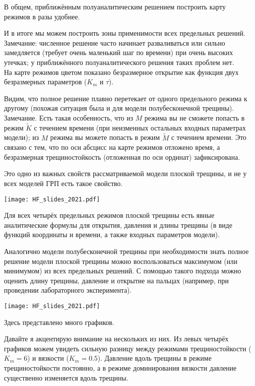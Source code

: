 \documentclass[main.tex]{subfiles}
\begin{document}
В общем, приближённым полуаналитическим решением построить карту режимов в разы удобнее.

И в итоге мы можем построить зоны применимости всех предельных решений.
\\

Замечание: численное решение часто начинает разваливаться или сильно замедляется (требует очень маленький шаг по времени) при очень высоких утечках; у приближённого полуаналитического решения таких проблем нет.
\\

На карте режимов цветом показано безразмерное открытие как функция двух безразмерных параметров ($K_m$ и $\tau$).

Видим, что полное решение плавно перетекает от одного предельного режима к другому (похожая ситуация была и для модели полубесконечной трещины).
\\

Замечание. Есть такая особенность, что из $M$ режима вы не сможете попасть в режим $\tilde{K}$ с течением времени (при неизменных остальных входных параметрах модели);
из $M$ режима вы можете попасть в режим $\tilde{M}$ с течением времени.
Это связано с тем, что по оси абсцисс на карте режимов отложено время, а безразмерная трещиностойкость (отложенная по оси ординат) зафиксирована.

Это одно из важных свойств рассматриваемой модели плоской трещины, и не у всех моделей ГРП есть такое свойство.

\texttt{[image: HF\_slides\_2021.pdf]}

Для всех четырёх предельных режимов плоской трещины есть явные аналитические формулы для открытия, давления и длины трещины (в виде функций координаты и времени, а также входных параметров модели).

Аналогично модели полубесконечной трещины при необходимости знать полное решение модели плоской трещины можно воспользоваться максимумом (или минимумом) из всех предельных решений.
С помощью такого подхода можно оценить длину трещины, давление и открытие на пальцах (например, при проведении лабораторного эксперимента).

\texttt{[image: HF\_slides\_2021.pdf]}

Здесь представлено много графиков.

Давайте я акцентирую внимание на нескольких из них.
Из левых четырёх графиков можем увидеть сильную разницу между режимами трещиностойкости ($K_m=6$) и вязкости ($K_m=0.5$).
Давление вдоль трещины в режиме трещиностойкости постоянно, а в режиме доминирования вязкости давление существенно изменяется вдоль трещины.
\\
\end{document}
